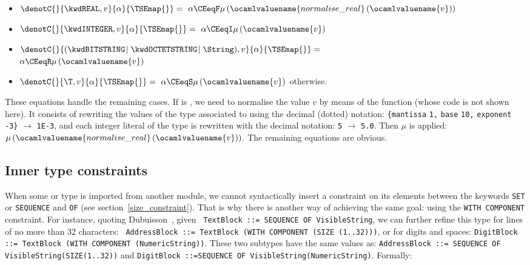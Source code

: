 \begin{itemize}

  \item $\denotC{}{\kwdREAL, v}{\alpha}{\TSEmap{}} = \,\, \alpha
         \CEeqF \mu \, (\ocamlvaluename{normalise\_real} \,
         (\ocamlvaluename{v}))$

  \item $\denotC{}{\kwdINTEGER, v}{\alpha}{\TSEmap{}} = \,\, \alpha
         \CEeqI \mu \, (\ocamlvaluename{v})$

  \item $\denotC{}{(\kwdBITSTRING \! \mid \kwdOCTETSTRING \! \mid
         \String), v}{\alpha}{\TSEmap{}} =$\\ 
         \hspace*{3mm} $\alpha \CEeqR \mu \, (\ocamlvaluename{v})$

  \item $\denotC{}{\T, v}{\alpha}{\TSEmap{}} = \,\, \alpha
        \CEeqS \mu \, (\ocamlvaluename{v})$ otherwise.

\end{itemize}

\medskip

These equations handle the remaining cases. If \T{} is \kwdREAL, we
need to normalise the value $v$ by means of the
 function (whose code is not shown
here). It consists of rewriting the values of the type associated to
\kwdREAL{} using the decimal (dotted) notation:
\verb+{+\texttt{mantissa} \texttt{\small 1,} \texttt{base}
\texttt{\small 10,} \texttt{exponent} \texttt{\small -3}\verb+}+
$\longrightarrow$ \texttt{\small 1E-3}, and each integer literal of
the \kwdREAL{} type is rewritten with the decimal notation:
\texttt{\small 5} $\longrightarrow$ \texttt{\small 5.0}. Then $\mu$ is
applied: $\mu \, (\ocamlvaluename{normalise\_real} \,
(\ocamlvaluename{v}))$. The remaining equations are obvious.


\subsection{Inner type constraints}
 
When some \kwdSETOF{} or \kwdSEQUENCEOF{} type is imported from
another \ASN module, we cannot syntactically insert a constraint on
its elements between the keywords \texttt{\small SET} or
\texttt{\small SEQUENCE} and \texttt{\small OF} (see
section~\ref{size_constraint}). That is why there is another way of
achieving the same goal: using the \texttt{\small WITH COMPONENT}
constraint. For instance, quoting
Dubuisson~\cite[\S{13.8.11}]{Dubuisson:2000}, given \texttt{\small
  TextBlock ::= SEQUENCE OF VisibleString}, we can further refine this
type for lines of no more than 32 characters: \texttt{\small
  Address\-Block ::= Text\-Block (WITH COM\-PO\-NENT (SIZE (1..32)))},
or for digits and spaces: \texttt{\small Digit\-Block ::= Text\-Block
  (WITH COM\-PO\-NENT (Numeric\-String))}. These two subtypes have the
same values as: \texttt{\small Address\-Block ::= SE\-QUEN\-CE OF
  Visible\-String(SIZE(1..32))} and \texttt{\small Digit\-Block
  ::=SE\-QUEN\-CE OF Vi\-si\-ble\-String(Numeric\-String)}. Formally:


